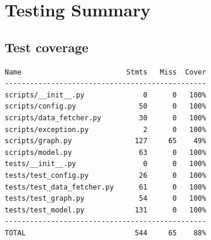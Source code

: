 \documentclass[12pt,a4paper]{report}
\begin{document}



\appendix

\chapter{Testing Summary}\label{app:test}
\section*{Test coverage}
\begin{lstlisting}
Name                         Stmts   Miss  Cover
------------------------------------------------
scripts/__init__.py              0      0   100%
scripts/config.py               50      0   100%
scripts/data_fetcher.py         30      0   100%
scripts/exception.py             2      0   100%
scripts/graph.py               127     65    49%
scripts/model.py                63      0   100%
tests/__init__.py                0      0   100%
tests/test_config.py            26      0   100%
tests/test_data_fetcher.py      61      0   100%
tests/test_graph.py             54      0   100%
tests/test_model.py            131      0   100%
------------------------------------------------
TOTAL                          544     65    88%
\end{lstlisting}
\end{document}
